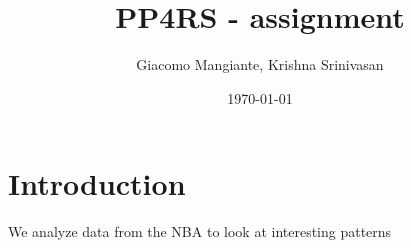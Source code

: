 \documentclass[12pt]{article}
\begin{document}
\title{PP4RS  - assignment}
\author{Giacomo Mangiante, Krishna Srinivasan}
\date{\today}
\maketitle

\section{Introduction}

We analyze data from the NBA to look at interesting patterns
\end{document}
